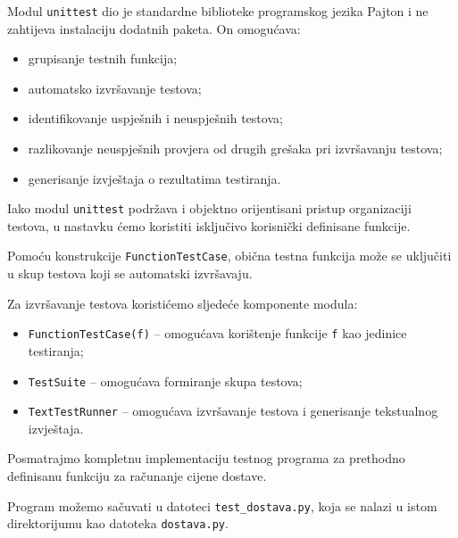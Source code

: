 Modul \texttt{unittest} dio je standardne biblioteke 
programskog jezika Pajton i ne zahtijeva instalaciju 
dodatnih paketa. On omogućava:

\begin{itemize}
	\item grupisanje testnih funkcija;
	\item automatsko izvršavanje testova;
	\item identifikovanje uspješnih i neuspješnih testova;
	\item razlikovanje neuspješnih provjera od drugih 
	grešaka pri izvršavanju testova;
	\item generisanje izvještaja o rezultatima testiranja.
\end{itemize}

Iako modul \texttt{unittest} podržava i objektno 
orijentisani pristup organizaciji testova, u nastavku 
ćemo koristiti isključivo korisnički definisane 
funkcije.

Pomoću konstrukcije \texttt{FunctionTestCase}, obična 
testna funkcija može se uključiti u skup testova koji 
se automatski izvršavaju.

Za izvršavanje testova koristićemo sljedeće komponente 
modula:

\begin{itemize}
	\item \texttt{FunctionTestCase(f)} -- omogućava 
	korištenje funkcije \texttt{f} kao jedinice testiranja;
	
	\item \texttt{TestSuite} -- omogućava formiranje 
	skupa testova;
	
	\item \texttt{TextTestRunner} -- omogućava 
	izvršavanje testova i generisanje tekstualnog 
	izvještaja.
\end{itemize}

Posmatrajmo kompletnu implementaciju testnog programa 
za prethodno definisanu funkciju za računanje cijene 
dostave.

Program možemo sačuvati u datoteci 
\texttt{test\_dostava.py}, koja se nalazi u istom 
direktorijumu kao datoteka \texttt{dostava.py}.

